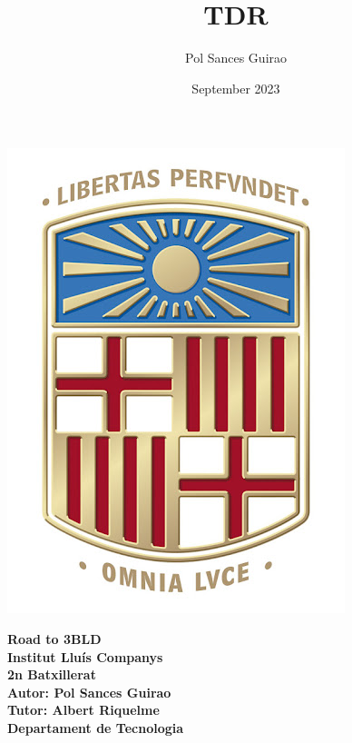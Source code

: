 \documentclass[11pt,oneside]{book}
\title{TDR}
\author{Pol Sances Guirao}
\date{September 2023}
\begin{document}
\frontmatter


\begin{titlepage}
    \centering
    \vspace*{\fill}
    
    \begin{minipage}{0.4\textwidth}
        \includegraphics[width=\textwidth]{img/logos/logo_ub.jpg}
    \end{minipage}
    \hfill
    \begin{minipage}{0.5\textwidth}
        \begin{center}
            \textbf{\Huge Road to 3BLD}\\
            \vspace{0.5cm}
            \textbf{\LARGE Institut Lluís Companys}\\
            \vspace{0.5cm}
            \textbf{\Large 2n Batxillerat}\\
            \vspace{0.5cm}
            \textbf{\large Autor: Pol Sances Guirao}\\
            \vspace{0.5cm}
            \textbf{\large Tutor: Albert Riquelme}\\
            \vspace{0.5cm}
            \textbf{\large Departament de Tecnologia}
        \end{center}
    \end{minipage}


\end{titlepage}
\end{document}
